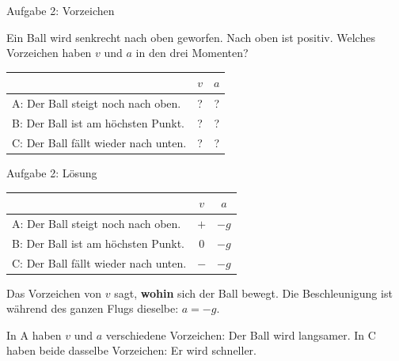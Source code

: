 \documentclass[14pt,aspectratio=169]{beamer}
\begin{document}
\begin{frame}{Aufgabe 2: Vorzeichen}
  \begin{aufgabebox}[Aufgabe 2]
    \small
    Ein Ball wird senkrecht nach oben geworfen. Nach oben ist positiv.
    Welches Vorzeichen haben $v$ und $a$ in den drei Momenten?
    \vspace{0.3em}

    \centering
    \begin{tabular}{lcc}
      \toprule
      & $v$ & $a$ \\
      \midrule
      A: Der Ball steigt noch nach oben. & ? & ? \\
      B: Der Ball ist am höchsten Punkt. & ? & ? \\
      C: Der Ball fällt wieder nach unten. & ? & ? \\
      \bottomrule
    \end{tabular}
  \end{aufgabebox}
\end{frame}

\begin{frame}{Aufgabe 2: Lösung}
  \small
  \centering
  \begin{tabular}{lcc}
    \toprule
    & $v$ & $a$ \\
    \midrule
    A: Der Ball steigt noch nach oben. & $+$ & $-g$ \\
    B: Der Ball ist am höchsten Punkt. & $0$ & $-g$ \\
    C: Der Ball fällt wieder nach unten. & $-$ & $-g$ \\
    \bottomrule
  \end{tabular}

  \vspace{0.6em}
  \raggedright
  \begin{merkbox}[Merke]
    Das Vorzeichen von $v$ sagt, \textbf{wohin} sich der Ball bewegt. Die
    Beschleunigung ist während des ganzen Flugs dieselbe: $a=-g$.
  \end{merkbox}
  \footnotesize
  In A haben $v$ und $a$ verschiedene Vorzeichen: Der Ball wird
  langsamer. In C haben beide dasselbe Vorzeichen: Er wird schneller.
\end{frame}
\end{document}
